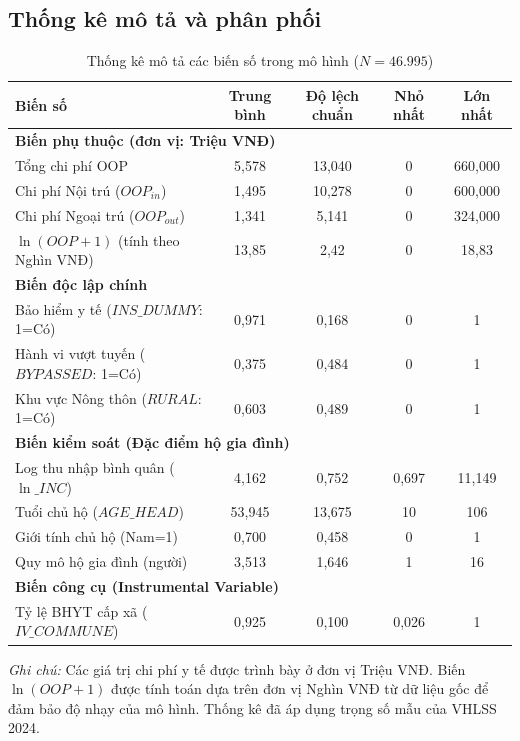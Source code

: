 \documentclass[12pt,a4paper]{article}
\begin{document}
\subsection{Thống kê mô tả và phân phối}

\begin{table}[htbp]
	\centering
	\caption{Thống kê mô tả các biến số trong mô hình ($N = 46.995$)}
	\label{tab:descriptive_stats}
	\begin{tabular}{lcccc}
		\toprule
		\textbf{Biến số} & \textbf{Trung bình} & \textbf{Độ lệch chuẩn} & \textbf{Nhỏ nhất} & \textbf{Lớn nhất} \\
		\midrule
		\multicolumn{5}{l}{\textbf{Biến phụ thuộc (đơn vị: Triệu VNĐ)}} \\
		Tổng chi phí OOP & 5,578 & 13,040 & 0 & 660,000 \\
		Chi phí Nội trú ($OOP_{in}$) & 1,495 & 10,278 & 0 & 600,000 \\
		Chi phí Ngoại trú ($OOP_{out}$) & 1,341 & 5,141 & 0 & 324,000 \\
		$\ln(OOP + 1)$ (tính theo Nghìn VNĐ) & 13,85 & 2,42 & 0 & 18,83 \\
		\midrule
		\multicolumn{5}{l}{\textbf{Biến độc lập chính}} \\
		Bảo hiểm y tế ($INS\_DUMMY$: 1=Có) & 0,971 & 0,168 & 0 & 1 \\
		Hành vi vượt tuyến ($BYPASSED$: 1=Có) & 0,375 & 0,484 & 0 & 1 \\
		Khu vực Nông thôn ($RURAL$: 1=Có) & 0,603 & 0,489 & 0 & 1 \\
		\midrule
		\multicolumn{5}{l}{\textbf{Biến kiểm soát (Đặc điểm hộ gia đình)}} \\
		Log thu nhập bình quân ($\ln\_INC$) & 4,162 & 0,752 & 0,697 & 11,149 \\
		Tuổi chủ hộ ($AGE\_HEAD$) & 53,945 & 13,675 & 10 & 106 \\
		Giới tính chủ hộ (Nam=1) & 0,700 & 0,458 & 0 & 1 \\
		Quy mô hộ gia đình (người) & 3,513 & 1,646 & 1 & 16 \\
		\midrule
		\multicolumn{5}{l}{\textbf{Biến công cụ (Instrumental Variable)}} \\
		Tỷ lệ BHYT cấp xã ($IV\_COMMUNE$) & 0,925 & 0,100 & 0,026 & 1 \\
		\bottomrule
	\end{tabular}
	\vspace{1ex}
	
	\parbox{14cm}{\footnotesize \textit{Ghi chú:} Các giá trị chi phí y tế được trình bày ở đơn vị Triệu VNĐ. Biến $\ln(OOP + 1)$ được tính toán dựa trên đơn vị Nghìn VNĐ từ dữ liệu gốc để đảm bảo độ nhạy của mô hình. Thống kê đã áp dụng trọng số mẫu của VHLSS 2024.}
\end{table}
\end{document}

